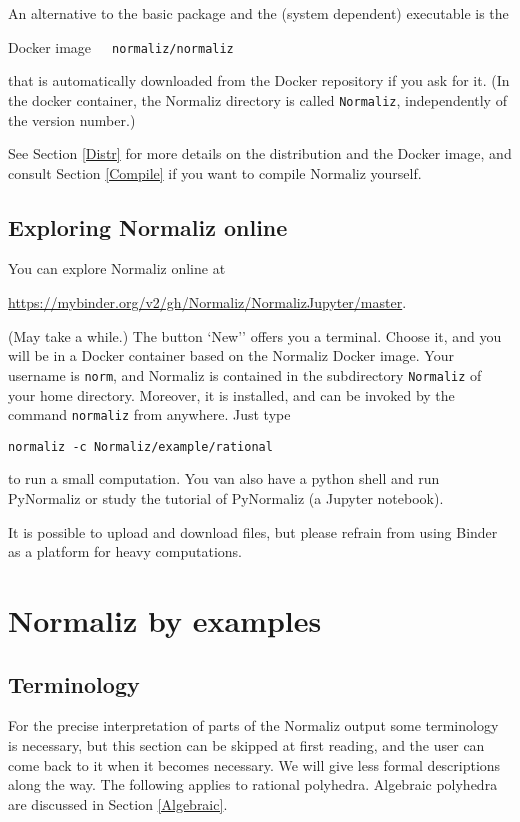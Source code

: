 \documentclass[12pt,a4paper]{scrartcl}
\theoremstyle{definition}
\begin{document}
An alternative to the basic package and the (system dependent) executable is the  
\begin{center}
	Docker image\ \  \ \verb|normaliz/normaliz|
\end{center}
that is automatically downloaded from the Docker repository if you ask for it. (In the docker container, the Normaliz directory is called \verb|Normaliz|, independently of the version number.)

See Section \ref{Distr} for more details on the distribution and the Docker image, and consult Section \ref{Compile} if you want to compile Normaliz yourself. 

\subsection{Exploring Normaliz online}

You can explore Normaliz online at
\begin{center}
 \url{https://mybinder.org/v2/gh/Normaliz/NormalizJupyter/master}. 
\end{center}
(May take a while.) The button `New'' offers you a terminal. Choose it, and you will be in a Docker container based on the Normaliz Docker image. Your username is \verb|norm|, and Normaliz is contained in the subdirectory \verb|Normaliz| of your home directory. Moreover, it is installed, and can be invoked by the command \verb|normaliz| from anywhere. Just type
\begin{Verbatim}
normaliz -c Normaliz/example/rational
\end{Verbatim}
to run a small computation. You van also have a python shell and run PyNormaliz or study the tutorial of PyNormaliz (a Jupyter notebook).

It is possible to upload and download files, but please refrain from using Binder as a platform for heavy computations.



\section{Normaliz by examples}\label{Examples}

\subsection{Terminology}\label{Term}

For the precise interpretation of parts of the Normaliz output some terminology is necessary, but this section can be skipped at first reading, and the user can come back to it when it becomes necessary. We will give less formal descriptions along the way. The following applies to rational polyhedra. Algebraic polyhedra are discussed in Section \ref{Algebraic}.
\end{document}
